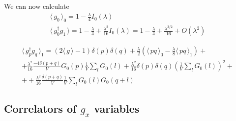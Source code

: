 \documentclass[12pt]{article}
\newcommand{\lr}[1]{ \left( #1 \right) }
\newcommand{\vev}[1]{ \langle \, #1 \, \rangle }
\begin{document}
We can now calculate
\begin{eqnarray}
\label{gcorrs_order0}
 \vev{g_0}_0 = 1 - \frac{\lambda}{4} I_0\lr{\lambda}
 \nonumber \\
 \vev{g^{\dag}_0 g_1} = 1 - \frac{\lambda}{4} + \frac{\lambda^2}{16} I_0\lr{\lambda} = 1 - \frac{\lambda}{4} + \frac{\lambda^{3/2}}{16} + O\lr{\lambda^2}
\end{eqnarray}

\begin{eqnarray}
\label{}
 \vev{g^{\dag}_p g_q}_1 =
 \lr{2 \vev{g} - 1} \delta\lr{p} \delta\lr{q}
 +
 \frac{\lambda}{2}
 \lr{\vev{p q}_0 - \frac{\lambda}{8} \vev{p q}_1}
 + \nonumber \\ +
 \frac{\lambda^2}{16} \frac{-4 \delta\lr{p+q}}{V} G_0\lr{p} \frac{1}{V} \sum\limits_l G_0\lr{l}
 + \frac{\lambda^2}{16} \delta\lr{p} \delta\lr{q} \lr{\frac{1}{V} \sum\limits_l G_0\lr{l}}^2
 + \nonumber \\ +
 + \frac{\lambda^2}{16} \frac{\delta\lr{p+q}}{V} \frac{1}{V} \sum\limits_{l} G_0\lr{l} G_0\lr{q+l}
 \end{eqnarray}

\subsection{Correlators of $g_x$ variables}
\label{subsec:gx_correlators_momentum}
\end{document}
